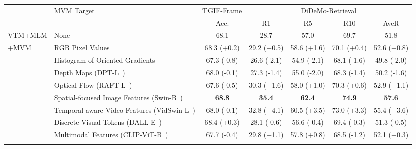 \documentclass[10pt,twocolumn,letterpaper]{article}
\newlength\savewidth
\newcommand\shline{\noalign{\global\savewidth\arrayrulewidth\global\arrayrulewidth 1pt}\hline\noalign{\global\arrayrulewidth\savewidth}}
\newcommand{\tablestyle}[2]{\setlength{\tabcolsep}{#1}\renewcommand{\arraystretch}{#2}\centering\footnotesize}
\newcommand{\siftgif}{68.8\xspace}
\newcommand{\sifdro}{35.4\xspace}
\newcommand{\sifdrf}{62.4\xspace}
\newcommand{\sifdrt}{74.9\xspace}
\newcommand{\sifaver}{57.6\xspace}
\begin{document}
\begin{table*}[t]
\centering
    \tablestyle{6pt}{1.0} 
    \def \w{20pt} 
\begin{tabular}{ll| ccccc}
        \shline
        \multirow{2}{*}{Pre-training Tasks} & \multirow{2}{*}{MVM Target} & TGIF-Frame & \multicolumn{4}{c}{DiDeMo-Retrieval} \\
        \cmidrule(lr){3-3}\cmidrule(lr){4-7}
         &  & Acc. & R1 & R5 & R10 & AveR \\
        \hline
VTM+MLM & None &  68.1  &  28.7 & 57.0 & 69.7 & 51.8\\
        \hline
        \multirow{7}{*}{+MVM} & RGB Pixel Values & 68.3 {\color{ForestGreen}(+0.2)} & 29.2 {\color{ForestGreen}(+0.5)} & 58.6 {\color{ForestGreen}(+1.6)} & 70.1 {\color{ForestGreen}(+0.4)}& 52.6 {\color{ForestGreen}(+0.8)}\\
          & Histogram of Oriented Gradients~\cite{dalal2005hog} & 67.3 {\color{BrickRed}(-0.8)} & 26.6 {\color{BrickRed}(-2.1)} & 54.9 {\color{BrickRed}(-2.1)} & 68.1 {\color{BrickRed}(-1.6)}& 49.8 {\color{BrickRed}(-2.0)}\\
          \cline{2-7} 
        & Depth Maps (DPT-L~\cite{ranftl2021dpt}) & 68.0 {\color{BrickRed}(-0.1)} & 27.3 {\color{BrickRed}(-1.4)} & 55.0 {\color{BrickRed}(-2.0)}& 68.3 {\color{BrickRed}(-1.4)}& 50.2 {\color{BrickRed}(-1.6)}\\
         & Optical Flow (RAFT-L~\cite{teed2020raft}) & 67.6 {\color{BrickRed}(-0.5)} & 30.3 {\color{ForestGreen}(+1.6)} & 58.0 {\color{ForestGreen}(+1.0)}& 70.3 {\color{ForestGreen}(+0.6)}& 52.9 {\color{ForestGreen}(+1.1)}\\
         \cline{2-7} 
         \rowcolor{lightgray}
          & Spatial-focused Image Features (Swin-B~\cite{liu2021swin}) & \textbf{\siftgif \space {\color{ForestGreen}(+0.7)}} & \textbf{ \sifdro \space {\color{ForestGreen}(+6.7)}} & \textbf{\sifdrf \space {\color{ForestGreen} (+5.4)}} & \textbf{\sifdrt \space {\color{ForestGreen}(+5.2)}} & \textbf{\sifaver \space {\color{ForestGreen}(+5.8)}} \\
& Temporal-aware Video Features (VidSwin-L~\cite{liu2022video-swin}) & 68.0 {\color{BrickRed}(-0.1)} &  32.8 {\color{ForestGreen}(+4.1)} &  60.5 {\color{ForestGreen}(+3.5)} &  73.0 {\color{ForestGreen}(+3.3)} &  55.4 {\color{ForestGreen}(+3.6)} \\
\cline{2-7}
         & Discrete Visual Tokens (DALL-E~\cite{ramesh2021dalle}) & 68.4 {\color{ForestGreen}(+0.3)} & 28.1 {\color{BrickRed}(-0.6)} & 56.6 {\color{BrickRed}(-0.4)} & 69.4 {\color{BrickRed}(-0.3)} & 51.3 {\color{BrickRed}(-0.5)} \\
          & Multimodal Features (CLIP-ViT-B~\cite{radford2021clip}) & 67.7 {\color{BrickRed}(-0.4)} & 29.8 {\color{ForestGreen}(+1.1)} & 57.8 {\color{ForestGreen}(+0.8)}& 68.5 {\color{BrickRed}(-1.2)} & 52.1 {\color{ForestGreen}(+0.3)}\\
        \shline
    \end{tabular}



\end{table*}
\end{document}
